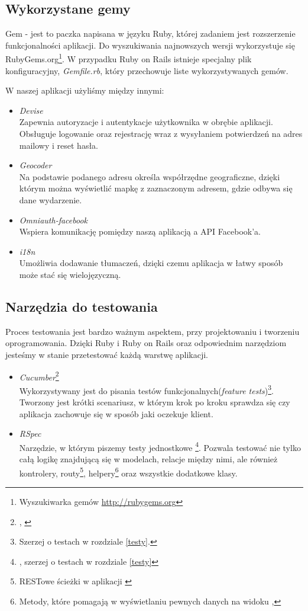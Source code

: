   \subsection{Wykorzystane gemy}
    Gem - jest to paczka napisana w języku Ruby, której zadaniem jest rozszerzenie funkcjonalności aplikacji. Do wyszukiwania najnowszych wersji wykorzystuje się RubyGems.org\footnote{Wyszukiwarka gemów \url{http://rubygems.org}}. W przypadku Ruby on Rails istnieje specjalny plik konfiguracyjny, \emph{Gemfile.rb}, który przechowuje liste wykorzystywanych gemów.

    W naszej aplikacji użyliśmy między innymi:
    \begin{itemize}
      \item \emph{Devise} \\ Zapewnia autoryzacje i autentykacje użytkownika w obrębie aplikacji. Obsługuje logowanie oraz rejestrację wraz z wysyłaniem potwierdzeń na adres mailowy i reset hasła.
      \item \emph{Geocoder} \\ Na podstawie podanego adresu określa współrzędne geograficzne, dzięki którym można wyświetlić mapkę z zaznaczonym adresem, gdzie odbywa się dane wydarzenie.
      \item \emph{Omniauth-facebook} \\ Wspiera komunikację pomiędzy naszą aplikacją a API Facebook'a.
      \item \emph{i18n} \\ Umożliwia dodawanie tłumaczeń, dzięki czemu aplikacja w łatwy sposób może stać się wielojęzyczną.
    \end{itemize}

  \subsection{Narzędzia do testowania}
    Proces testowania jest bardzo ważnym aspektem, przy projektowaniu i tworzeniu oprogramowania. Dzięki Ruby i Ruby on Rails oraz odpowiednim narzędziom jesteśmy w stanie przetestować każdą warstwę aplikacji.

    \begin{itemize}
      \item \emph{Cucumber}\footnote{\cite{cucumber}, \cite{testing_tuesday} } \\ Wykorzystywany jest do pisania testów funkcjonalnych(\emph{feature tests})\footnote{Szerzej o testach w rozdziale \ref{testy}.}. Tworzony jest krótki scenariusz, w którym krok po kroku sprawdza się czy aplikacja zachowuje się w sposób jaki oczekuje klient.
      \item \emph{RSpec} \\ Narzędzie, w którym piszemy testy jednostkowe \footnote{\cite{rspec}, szerzej o testach w rozdziale \ref{testy}}. Pozwala testować nie tylko całą logikę znajdującą się w modelach, relacje między nimi, ale również kontrolery, routy\footnote{RESTowe ścieżki w aplikacji \cite{head_first}}, helpery\footnote{Metody, które pomagają w wyświetlaniu pewnych danych na widoku \cite{rspec},\cite{rails_guide}} oraz wszystkie dodatkowe klasy.
    \end{itemize}

